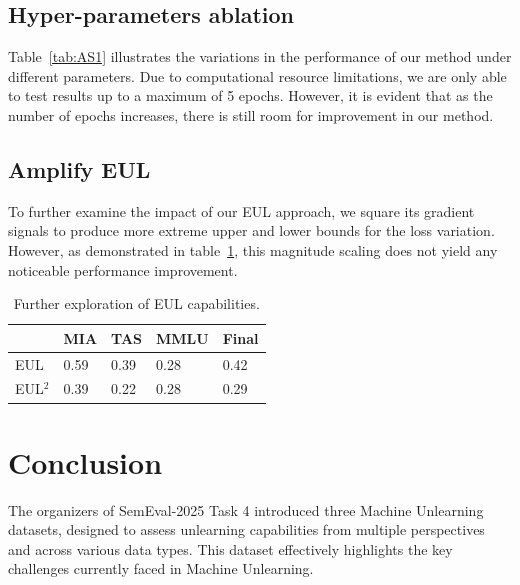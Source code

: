\documentclass[11pt]{article}
\begin{document}
\subsection{Hyper-parameters ablation}  

Table~\ref{tab:AS1} illustrates the variations in the performance of our method under different parameters. Due to computational resource limitations, we are only able to test results up to a maximum of 5 epochs. However, it is evident that as the number of epochs increases, there is still room for improvement in our method.

\subsection{Amplify EUL} 
To further examine the impact of our EUL approach, we square its gradient signals to produce more extreme upper and lower bounds for the loss variation. However, as demonstrated in table~\ref{tab:accents}, this magnitude scaling does not yield any noticeable performance improvement.

\begin{table}[h]\footnotesize
  \centering
    \begin{tabular}{l|l|l|l|l}
    \hline
        ~ & MIA & TAS & MMLU & Final \\ \hline
        EUL & 0.59 & 0.39 & 0.28 & 0.42 \\ \hline
        EUL$^2$ & 0.39 & 0.22 & 0.28 & 0.29 \\ \hline
    \end{tabular}
  \caption{Further exploration of EUL capabilities.}
  \label{tab:accents}
\end{table}





\section{Conclusion} 
The organizers of SemEval-2025 Task 4 introduced three Machine Unlearning datasets, designed to assess unlearning capabilities from multiple perspectives and across various data types. This dataset effectively highlights the key challenges currently faced in Machine Unlearning.
\end{document}
